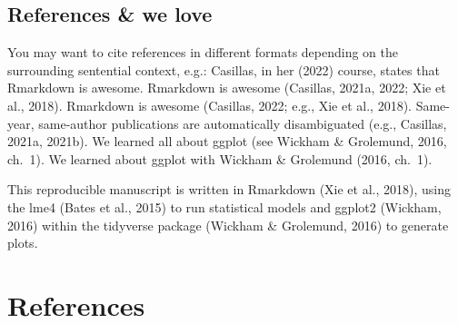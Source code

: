 \documentclass[
]{article}
\begin{document}
\hypertarget{references-we-love}{%
\subsection{References \& we love}\label{references-we-love}}

You may want to cite references in different formats depending on the surrounding sentential context, e.g.: Casillas, in her (2022) course, states that Rmarkdown is awesome. Rmarkdown is awesome (Casillas, 2021a, 2022; Xie et al., 2018). Rmarkdown is awesome (Casillas, 2022; e.g., Xie et al., 2018). Same-year, same-author publications are automatically disambiguated (e.g., Casillas, 2021a, 2021b). We learned all about ggplot (see Wickham \& Grolemund, 2016, ch.~1). We learned about ggplot with Wickham \& Grolemund (2016, ch.~1).

This reproducible manuscript is written in Rmarkdown (Xie et al., 2018), using the lme4 (Bates et al., 2015) to run statistical models and ggplot2 (Wickham, 2016) within the tidyverse package (Wickham \& Grolemund, 2016) to generate plots.

\hypertarget{references}{%
\section{References}\label{references}}
\end{document}
